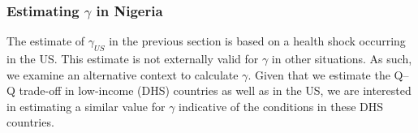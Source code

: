 \documentclass[subeqn]{article}
\begin{document}
\begin{spacing}{1.4}







\subsubsection{Estimating $\gamma$ in Nigeria}
The estimate of $\gamma_{US}$ in the previous section is based on a health shock
occurring in the US.  This estimate is not externally valid for $\gamma$ in other
situations.  As such, we examine an alternative context to calculate $\gamma$.
Given that we estimate the Q--Q trade-off in low-income (DHS) countries as well
as in the US, we are interested in estimating a similar value for $\gamma$
indicative of the conditions in these DHS countries.


\end{spacing}
\end{document}
